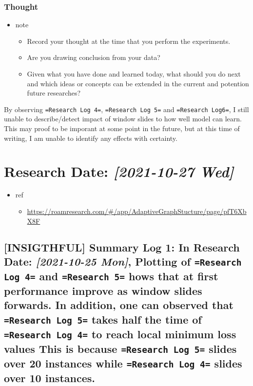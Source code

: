 \documentclass[11pt]{article}
\begin{document}
\subsubsection{Thought}
\label{sec:org0b9aa64}
\begin{itemize}
\item note
\begin{itemize}
\item Record your thought at the time that you perform the experiments.
\item Are you drawing conclusion from your data?
\item Given what you have done and learned today, what should you do next and which ideas or concepts can be extended in the current and potention future researches?
\end{itemize}
\end{itemize}

By observing \texttt{=Research Log 4=}, \texttt{=Research Log 5=} and \texttt{=Research Log6=}, I still unable to describe/detect impact of window slides to how well model can learn. This may proof to be imporant at some point in the future, but at this time of writing, I am unable to identify any effects with certainty.


\section{Research Date: \textit{[2021-10-27 Wed]}}
\label{sec:org0aea76e}
\begin{itemize}
\item ref
\begin{itemize}
\item \url{https://roamresearch.com/\#/app/AdaptiveGraphStucture/page/pfT6XbX8F}
\end{itemize}
\end{itemize}
\subsection{[INSIGTHFUL] Summary Log 1: In Research Date: \textit{[2021-10-25 Mon]}, Plotting of \texttt{=Research Log 4=} and \texttt{=Research 5=} hows that at first performance improve as window slides forwards. In addition, one can observed that \texttt{=Research Log 5=} takes half the time of \texttt{=Research Log 4=} to reach local minimum loss values This is because \texttt{=Research Log 5=} slides over 20 instances while \texttt{=Research Log 4=} slides over 10 instances.}
\label{sec:org8669e5a}
\end{document}
